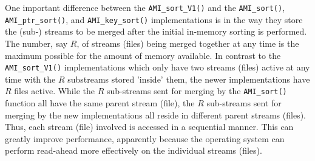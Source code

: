 One important difference between the \lstinline|AMI_sort_V1()|
and the \lstinline|AMI_sort()|, \lstinline|AMI_ptr_sort()|, and
\lstinline|AMI_key_sort()| implementations is in the way they
store the (sub-) streams to be merged after the initial
in-memory sorting is performed. The number, say $R$, of
streams (files) being merged together at any time is the maximum
possible for the amount of memory available. In contrast to
the \lstinline|AMI_sort_V1()| implementations which only have
two streams (files) active at any time with the $R$ substreams
stored 'inside' them, the newer implementations have $R$
files active. While the $R$ sub-streams sent
for merging by the \lstinline|AMI_sort()| function all have
the same parent stream (file), the $R$ sub-streams sent for merging
by the new implementations all reside in different parent
streams (files). Thus, each stream (file) involved is accessed in a
sequential manner. This can greatly improve performance,
apparently because the operating system can perform
read-ahead more effectively on the individual
streams (files).




